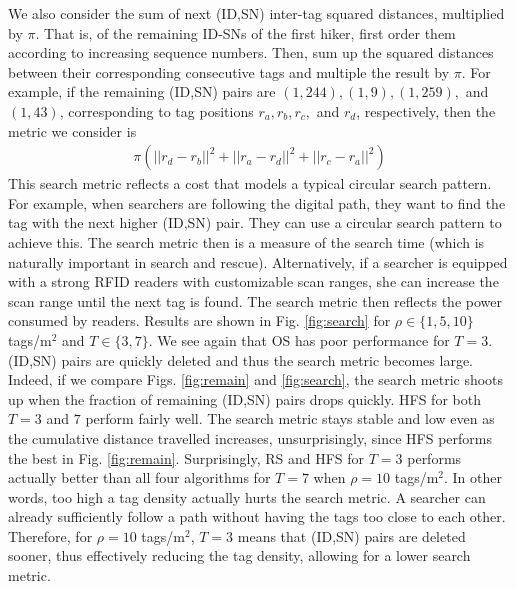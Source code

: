\documentclass[conference]{IEEEtran}
\begin{document}
We also consider the sum of next (ID,SN) inter-tag squared distances, multiplied by $\pi$.  That is, of the remaining ID-SNs of the first hiker, first order them according to increasing sequence numbers.  Then, sum up the squared distances between their corresponding consecutive tags and multiple the result by $\pi$.  For example, if the remaining (ID,SN) pairs are $(1,244), (1,9), (1,259),$ and $(1,43)$, corresponding to tag positions $r_a, r_b, r_c,$ and $r_d$, respectively,  then the metric we consider is 
\begin{eqnarray}
\pi \left( || r_d - r_b ||^2 + || r_a - r_d ||^2 + || r_c - r_a ||^2 \right)
\end{eqnarray}
This search metric reflects a cost that models a typical circular search pattern.  For example, when searchers are following the digital path, they want to find the tag with the next higher (ID,SN) pair.  They can use a circular search pattern to achieve this.  The search metric then is a measure of the search time (which is naturally important in search and rescue).  Alternatively, if a searcher is equipped with a strong RFID readers with customizable scan ranges, she can increase the scan range until the next tag is found.  The search metric then reflects the power consumed by readers.  Results are shown in Fig. \ref{fig:search} for $\rho \in \{1, 5, 10\}$ tags/m$^2$ and $T \in \{3, 7\}$.  We see again that OS has poor performance for $T=3$.  (ID,SN) pairs are quickly deleted and thus the search metric becomes large.  Indeed, if we compare Figs. \ref{fig:remain} and \ref{fig:search}, the search metric shoots up when the fraction of remaining (ID,SN) pairs drops quickly.  HFS for both $T=3$ and $7$ perform fairly well.  The search metric stays stable and low even as the cumulative distance travelled increases, unsurprisingly, since HFS performs the best in Fig. \ref{fig:remain}.  Surprisingly, RS and HFS for $T=3$ performs actually better than all four algorithms for $T=7$ when $\rho = 10$ tags/m$^2$.  In other words, too high a tag density actually hurts the search metric.  A searcher can already sufficiently follow a path without having the tags too close to each other.  Therefore, for $\rho = 10$ tags/m$^2$, $T=3$ means that (ID,SN) pairs are deleted sooner, thus effectively reducing the tag density, allowing for a lower search metric.
\end{document}
